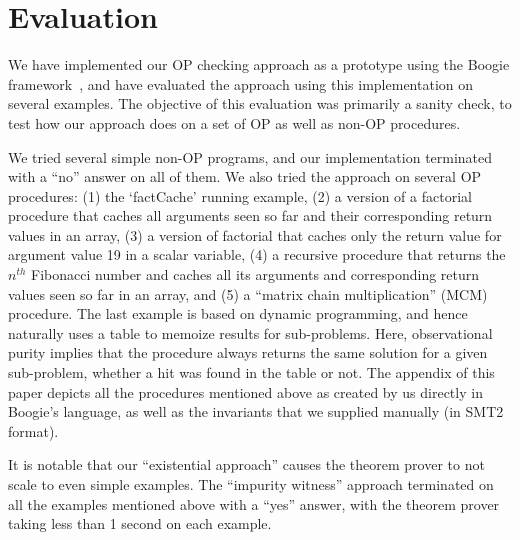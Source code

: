 \section{Evaluation}\label{sec:experiments}

We have implemented our OP checking approach as a prototype using the Boogie
framework~\cite{leino2008boogie}, and have evaluated the approach using
this implementation on several examples. The objective of this evaluation
was primarily a sanity check, to test how our approach does on a set of
OP as well as non-OP procedures.

We tried several simple non-OP programs, and our implementation terminated
with a ``no'' answer on all of them.  We also tried the approach on several
OP procedures: (1) the `factCache' running example, (2) a version of
a factorial procedure that caches all arguments seen so far and their
corresponding return values in an array, (3) a version of factorial that caches
only the return value for argument value 19 in a scalar variable, (4) a
recursive procedure that returns the $n^\mathit{th}$ Fibonacci number and
caches all its arguments and corresponding return values seen so far in an
array, and (5) a ``matrix chain multiplication'' (MCM) procedure.
The last example  is based
on dynamic programming, and hence naturally uses a table to memoize 
results for sub-problems. Here, observational purity implies that the procedure always
returns the same solution for a given sub-problem, whether a hit was found
in the table or not.  The appendix of this paper depicts all the procedures
mentioned above as created by us directly in Boogie's language, as well as
the invariants that we supplied manually (in  SMT2
format).


It is notable that our ``existential approach'' causes the theorem prover
to not scale to even simple examples. The ``impurity witness'' approach
terminated on all the examples mentioned above with a ``yes'' answer,
with the theorem prover
taking less than 1 second on each example.

